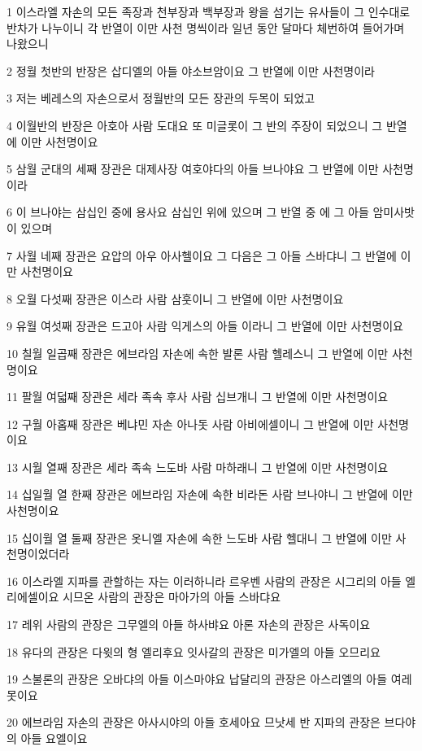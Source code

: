 \par 1 이스라엘 자손의 모든 족장과 천부장과 백부장과 왕을 섬기는 유사들이 그 인수대로 반차가 나누이니 각 반열이 이만 사천 명씩이라 일년 동안 달마다 체번하여 들어가며 나왔으니
\par 2 정월 첫반의 반장은 삽디엘의 아들 야소브암이요 그 반열에 이만 사천명이라
\par 3 저는 베레스의 자손으로서 정월반의 모든 장관의 두목이 되었고
\par 4 이월반의 반장은 아호아 사람 도대요 또 미글롯이 그 반의 주장이 되었으니 그 반열에 이만 사천명이요
\par 5 삼월 군대의 세째 장관은 대제사장 여호야다의 아들 브나야요 그 반열에 이만 사천명이라
\par 6 이 브나야는 삼십인 중에 용사요 삼십인 위에 있으며 그 반열 중 에 그 아들 암미사밧이 있으며
\par 7 사월 네째 장관은 요압의 아우 아사헬이요 그 다음은 그 아들 스바댜니 그 반열에 이만 사천명이요
\par 8 오월 다섯째 장관은 이스라 사람 삼훗이니 그 반열에 이만 사천명이요
\par 9 유월 여섯째 장관은 드고아 사람 익게스의 아들 이라니 그 반열에 이만 사천명이요
\par 10 칠월 일곱째 장관은 에브라임 자손에 속한 발론 사람 헬레스니 그 반열에 이만 사천명이요
\par 11 팔월 여덟째 장관은 세라 족속 후사 사람 십브개니 그 반열에 이만 사천명이요
\par 12 구월 아홉째 장관은 베냐민 자손 아나돗 사람 아비에셀이니 그 반열에 이만 사천명이요
\par 13 시월 열째 장관은 세라 족속 느도바 사람 마하래니 그 반열에 이만 사천명이요
\par 14 십일월 열 한째 장관은 에브라임 자손에 속한 비라돈 사람 브나야니 그 반열에 이만 사천명이요
\par 15 십이월 열 둘째 장관은 옷니엘 자손에 속한 느도바 사람 헬대니 그 반열에 이만 사천명이었더라
\par 16 이스라엘 지파를 관할하는 자는 이러하니라 르우벤 사람의 관장은 시그리의 아들 엘리에셀이요 시므온 사람의 관장은 마아가의 아들 스바댜요
\par 17 레위 사람의 관장은 그무엘의 아들 하사뱌요 아론 자손의 관장은 사독이요
\par 18 유다의 관장은 다윗의 형 엘리후요 잇사갈의 관장은 미가엘의 아들 오므리요
\par 19 스불론의 관장은 오바댜의 아들 이스마야요 납달리의 관장은 아스리엘의 아들 여레못이요
\par 20 에브라임 자손의 관장은 아사시야의 아들 호세아요 므낫세 반 지파의 관장은 브다야의 아들 요엘이요
